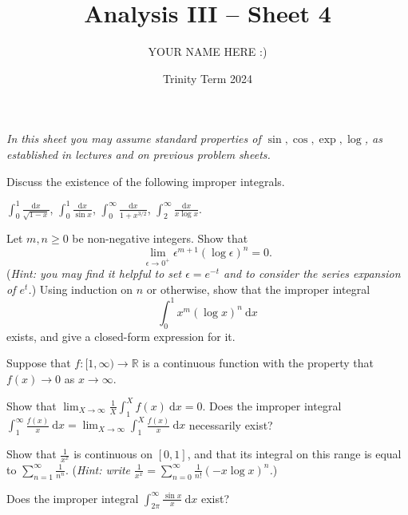 \documentclass[answers]{exam}
\title{Analysis III -- Sheet 4}
\author{YOUR NAME HERE :)}
\date{Trinity Term 2024}
\begin{document}
\maketitle
\emph{In this sheet you may assume standard properties of $\sin , \cos , \exp , \log$, as established in lectures and on previous problem sheets.}
\begin{questions}

\question%
Discuss the existence of the following improper integrals.
\begin{subparts}
\subpart $\displaystyle\int_{0}^{1} \frac{\mathrm d x}{\sqrt{1-x}}$,
\subpart $\displaystyle\int_{0}^{1} \frac{\mathrm d x}{\sin x}$,
\subpart $\displaystyle\int_{0}^{\infty} \frac{\mathrm d x}{1+x^{3 / 2}}$,
\subpart $\displaystyle\int_{2}^{\infty} \frac{\mathrm d x}{x \log x}$.
\end{subparts}



\question%
Let $m, n \geqslant 0$ be non-negative integers. Show that \[
	\lim _{\epsilon \rightarrow 0^{+}} \epsilon^{m+1}(\log \epsilon)^{n}=0.
\] (\emph{Hint: you may find it helpful to set $\epsilon=e^{-t}$ and to consider the series expansion of $e^{t}$.}) Using induction on $n$ or otherwise, show that the improper integral \[
	\int_{0}^{1} x^{m}(\log x)^{n} ~\mathrm d x
\] exists, and give a closed-form expression for it.



\question%
Suppose that $f:[1, \infty) \rightarrow \mathbb{R}$ is a continuous function with the property that $f(x) \rightarrow 0$ as $x \rightarrow \infty$.
\begin{subparts}
\subpart Show that $\lim _{X \rightarrow \infty} \frac{1}{X} \int_{1}^{X} f(x) ~\mathrm d x=0$.
\subpart Does the improper integral $\int_{1}^{\infty} \frac{f(x)}{x} ~\mathrm d x=\lim _{X \rightarrow \infty} \int_{1}^{X} \frac{f(x)}{x} ~\mathrm d x$ necessarily exist?
\end{subparts}



\question%
Show that $\frac{1}{x^{x}}$ is continuous on $[0,1]$, and that its integral on this range is equal to $\sum_{n=1}^{\infty} \frac{1}{n^{n}}$. (\emph{Hint: write $\frac{1}{x^{x}}=\sum_{n=0}^{\infty} \frac{1}{n !}(-x \log x)^{n}$.})



\question%
Does the improper integral $\int_{2 \pi}^{\infty} \frac{\sin x}{x} ~\mathrm d x$ exist?

\end{questions}
\end{document}
